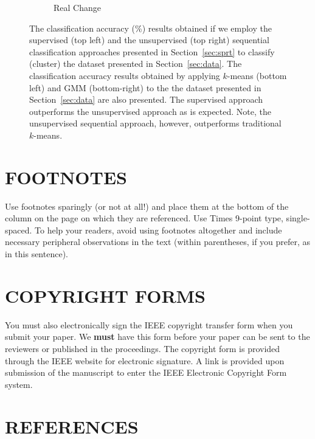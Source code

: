\documentclass{article}
\begin{document}
\begin{figure}[h]
\begin{subfigure}[b]{0.5\linewidth}
    \caption{Real Change} 
    \label{fig7:d} 
  \end{subfigure} 
  \label{fig7} 
  \caption{The classification accuracy (\%) results obtained if we employ the supervised (top left) and the unsupervised (top right) sequential classification approaches presented in Section~\ref{sec:sprt} to classify (cluster) the dataset presented in Section~\ref{sec:data}. The classification accuracy results obtained by applying $k$-means (bottom left) and GMM (bottom-right) to the the dataset presented in Section~\ref{sec:data} are also presented. The supervised approach outperforms the unsupervised approach as is expected. Note, the unsupervised sequential approach, however, outperforms traditional $k$-means.}
  \label{fig:results}
\end{figure}






\vfill
\pagebreak




\section{FOOTNOTES}
\label{sec:foot}

Use footnotes sparingly (or not at all!) and place them at the bottom of the
column on the page on which they are referenced. Use Times 9-point type,
single-spaced. To help your readers, avoid using footnotes altogether and
include necessary peripheral observations in the text (within parentheses, if
you prefer, as in this sentence).


\section{COPYRIGHT FORMS}
\label{sec:copyright}

You must also electronically sign the IEEE copyright transfer
form when you submit your paper. We {\bf must} have this form
before your paper can be sent to the reviewers or published in
the proceedings. The copyright form is provided through the IEEE
website for electronic signature. A link is provided upon
submission of the manuscript to enter the IEEE Electronic
Copyright Form system.

\section{REFERENCES}
\label{sec:ref}
\end{document}
